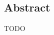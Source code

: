 \newpage
\vspace*{3.5cm}
\begin{center}
\begin{minipage}{12.5cm}
\section*{Abstract}
TODO






\end{minipage}
\end{center}



